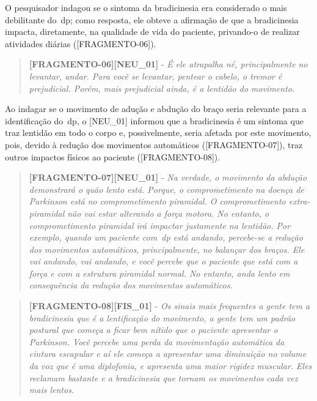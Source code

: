 O pesquisador indagou se o sintoma da bradicinesia era considerado o mais debilitante do~\ac{dp}; como resposta, ele obteve a afirmação de que a bradicinesia impacta, diretamente, na qualidade de vida do paciente, privando-o de realizar atividades diárias ([FRAGMENTO-06]).

\begin{quote}
\textbf{[FRAGMENTO-06][NEU\_01]} - 
\emph{
É ele atrapalha né, principalmente no levantar, andar. Para você se levantar, pentear o cabelo, o tremor é prejudicial. Porém, mais prejudicial ainda, é a lentidão do movimento.
}
\end{quote}

Ao indagar se o movimento de adução e abdução do braço seria relevante para a identificação do~\ac{dp}, o [NEU\_01] informou que a bradicinesia é um sintoma que traz lentidão em todo o corpo e, possivelmente, seria afetada por este movimento, pois, devido à redução dos movimentos automáticos ([FRAGMENTO-07]), traz outros impactos físicos ao paciente ([FRAGMENTO-08]).

\begin{quote}
\textbf{[FRAGMENTO-07][NEU\_01]} - 
\emph{
Na verdade, o movimento da abdução demonstrará o quão lento está. Porque, o comprometimento na doença de Parkinson está no comprometimento piramidal. O comprometimento extra-piramidal não vai estar alterando a força motora. No entanto, o comprometimento piramidal irá impactar justamente na lentidão. Por exemplo, quando um paciente com~\ac{dp} está andando, percebe-se a redução dos movimentos automáticos, principalmente, no balançar dos braços. Ele vai andando, vai andando, e você percebe que o paciente que está com a força e com a estrutura piramidal normal. No entanto, anda lento em consequência da redução dos movimentos automáticos.
}
\end{quote}


\begin{quote}
\textbf{[FRAGMENTO-08][FIS\_01]} - 
\emph{
Os sinais mais frequentes a gente tem a bradicinesia que é a lentificação do movimento, a gente tem um padrão postural que começa a ficar bem nítido que o paciente apresentar o Parkinson. Você percebe uma perda da movimentação automática da cintura escapular e aí ele começa a apresentar uma diminuição no volume da voz que é uma diplofonia, e apresenta uma maior rigidez muscular. Eles reclamam bastante e a bradicinesia que tornam os movimentos cada vez mais lentos.
}
\end{quote}


